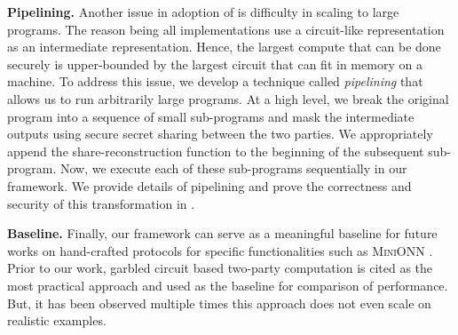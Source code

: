 \textbf{Pipelining.} Another issue in adoption of \mpc is difficulty in scaling to large programs. 
The reason being all \mpc implementations use a circuit-like representation as an intermediate representation. Hence, the largest compute that can be done securely is upper-bounded by the largest circuit that can fit in memory on a machine. 
To address this issue, we develop a technique called \emph{pipelining} that allows us to run arbitrarily large programs. At a high level, we break the original program into a sequence of small sub-programs and mask the intermediate outputs using secure secret sharing between the two parties. We appropriately append the share-reconstruction function to the beginning of the subsequent sub-program. Now, we execute each of these sub-programs sequentially in our framework. We provide details of pipelining and prove the correctness and security of this transformation in .

\textbf{Baseline.} Finally, our framework \tool can serve as a meaningful baseline for future works on hand-crafted \mpc protocols for specific functionalities such as \textsc{MiniONN} \cite{minionn}. 
Prior to our work, garbled circuit based two-party computation is cited as the most practical approach and used as the baseline for comparison of performance. But, it has been observed multiple times this approach does not even scale on realistic examples.



